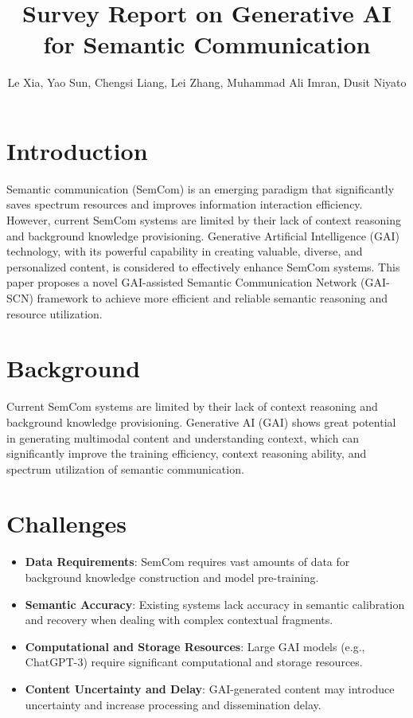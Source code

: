 \documentclass{article}
\title{Survey Report on Generative AI for Semantic Communication}
\author{Le Xia, Yao Sun, Chengsi Liang, Lei Zhang, Muhammad Ali Imran, Dusit Niyato}
\date{}
\begin{document}
\maketitle

\section{Introduction}

Semantic communication (SemCom) is an emerging paradigm that significantly saves spectrum resources and improves information interaction efficiency. However, current SemCom systems are limited by their lack of context reasoning and background knowledge provisioning. Generative Artificial Intelligence (GAI) technology, with its powerful capability in creating valuable, diverse, and personalized content, is considered to effectively enhance SemCom systems. This paper proposes a novel GAI-assisted Semantic Communication Network (GAI-SCN) framework to achieve more efficient and reliable semantic reasoning and resource utilization.

\section{Background}

Current SemCom systems are limited by their lack of context reasoning and background knowledge provisioning. Generative AI (GAI) shows great potential in generating multimodal content and understanding context, which can significantly improve the training efficiency, context reasoning ability, and spectrum utilization of semantic communication.

\section{Challenges}

\begin{itemize}
    \item \textbf{Data Requirements}: SemCom requires vast amounts of data for background knowledge construction and model pre-training.
    \item \textbf{Semantic Accuracy}: Existing systems lack accuracy in semantic calibration and recovery when dealing with complex contextual fragments.
    \item \textbf{Computational and Storage Resources}: Large GAI models (e.g., ChatGPT-3) require significant computational and storage resources.
    \item \textbf{Content Uncertainty and Delay}: GAI-generated content may introduce uncertainty and increase processing and dissemination delay.
\end{itemize}
\end{document}
